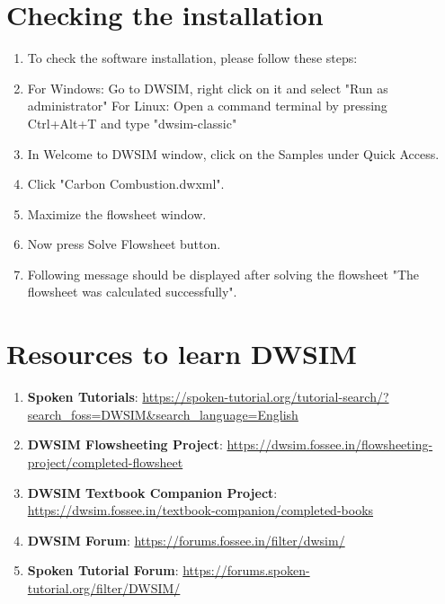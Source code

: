 \documentclass[a4paper,12pt]{article}
\begin{document}
\section{Checking the installation}

\begin{enumerate}

\item To check the software installation, please follow these steps:
\item For Windows: Go to DWSIM, right click on it and select "Run as administrator"
\newline For Linux: Open a command terminal by pressing Ctrl+Alt+T and type "dwsim-classic"
\item In Welcome to DWSIM window, click on the Samples under Quick Access.
\item Click "Carbon Combustion.dwxml".
\item Maximize the flowsheet window.
\item Now press Solve Flowsheet button.
\item Following message should be displayed after solving the flowsheet "The flowsheet was calculated successfully".

\end{enumerate}
\section{Resources to learn DWSIM}

\begin{enumerate}

\item \textbf{Spoken Tutorials}: \url{https://spoken-tutorial.org/tutorial-search/?search_foss=DWSIM&search_language=English}
\item \textbf{DWSIM Flowsheeting Project}: \url{https://dwsim.fossee.in/flowsheeting-project/completed-flowsheet}
\item \textbf{DWSIM Textbook Companion Project}: \url{https://dwsim.fossee.in/textbook-companion/completed-books}
\item \textbf{DWSIM Forum}: \url{https://forums.fossee.in/filter/dwsim/}
\item \textbf{Spoken Tutorial Forum}: \url{https://forums.spoken-tutorial.org/filter/DWSIM/}
\end{enumerate}
\end{document}
